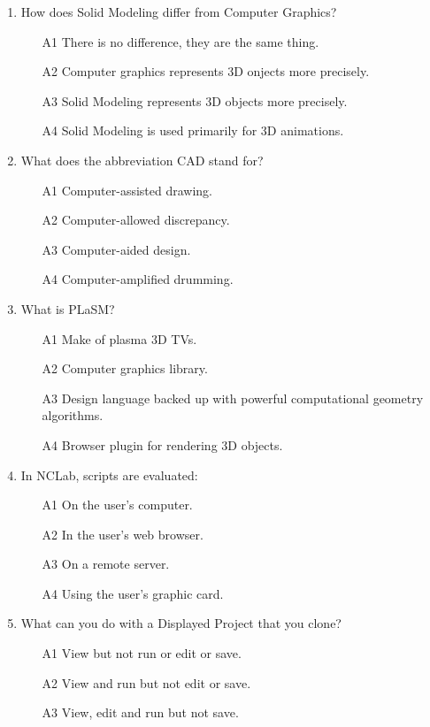 \documentclass{article}
\begin{document}
\begin{enumerate}
\item How does Solid Modeling differ from Computer Graphics?
\begin{itemize}
\item[A1] There is no difference, they are the same thing. 
\item[A2] Computer graphics represents 3D onjects more precisely.
\item[A3] Solid Modeling represents 3D objects more precisely.
\item[A4] Solid Modeling is used primarily for 3D animations.
\end{itemize}
\item What does the abbreviation CAD stand for?
\begin{itemize}
\item[A1] Computer-assisted drawing.
\item[A2] Computer-allowed discrepancy.
\item[A3] Computer-aided design.
\item[A4] Computer-amplified drumming.
\end{itemize}
\item What is PLaSM?
\begin{itemize}
\item[A1] Make of plasma 3D TVs.
\item[A2] Computer graphics library.
\item[A3] Design language backed up with powerful computational geometry algorithms.
\item[A4] Browser plugin for rendering 3D objects.
\end{itemize}
\item In NCLab, scripts are evaluated:
\begin{itemize}
\item[A1] On the user's computer.
\item[A2] In the user's web browser.
\item[A3] On a remote server.
\item[A4] Using the user's graphic card.
\end{itemize}
\item What can you do with a Displayed Project that you clone?
\begin{itemize}
\item[A1] View but not run or edit or save.
\item[A2] View and run but not edit or save.
\item[A3] View, edit and run but not save.

\end{itemize}
\end{enumerate}
\end{document}
